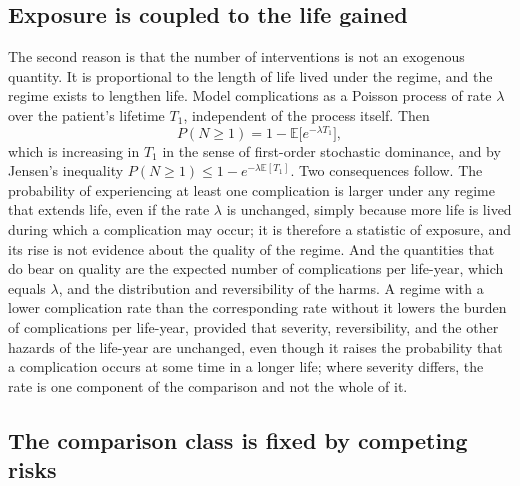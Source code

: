 \documentclass[11pt]{article}
\theoremstyle{plain}
\theoremstyle{definition}
\theoremstyle{remark}
\newcommand{\E}{\mathbb{E}}
\begin{document}
\subsection{Exposure is coupled to the life gained}

The second reason is that the number of interventions is not an exogenous quantity. It is proportional to the length of life lived under the regime, and the regime exists to lengthen life. Model complications as a Poisson process of rate $\lambda$ over the patient's lifetime $T_1$, independent of the process itself. Then
\begin{equation}\label{eq:poisson}
P(N\ge1)=1-\E\big[e^{-\lambda T_1}\big],
\end{equation}
which is increasing in $T_1$ in the sense of first-order stochastic dominance, and by Jensen's inequality $P(N\ge1)\le1-e^{-\lambda\E[T_1]}$. Two consequences follow. The probability of experiencing at least one complication is larger under any regime that extends life, even if the rate $\lambda$ is unchanged, simply because more life is lived during which a complication may occur; it is therefore a statistic of exposure, and its rise is not evidence about the quality of the regime. And the quantities that do bear on quality are the expected number of complications per life-year, which equals $\lambda$, and the distribution and reversibility of the harms. A regime with a lower complication rate than the corresponding rate without it lowers the burden of complications per life-year, provided that severity, reversibility, and the other hazards of the life-year are unchanged, even though it raises the probability that a complication occurs at some time in a longer life; where severity differs, the rate is one component of the comparison and not the whole of it.

\subsection{The comparison class is fixed by competing risks}
\end{document}
